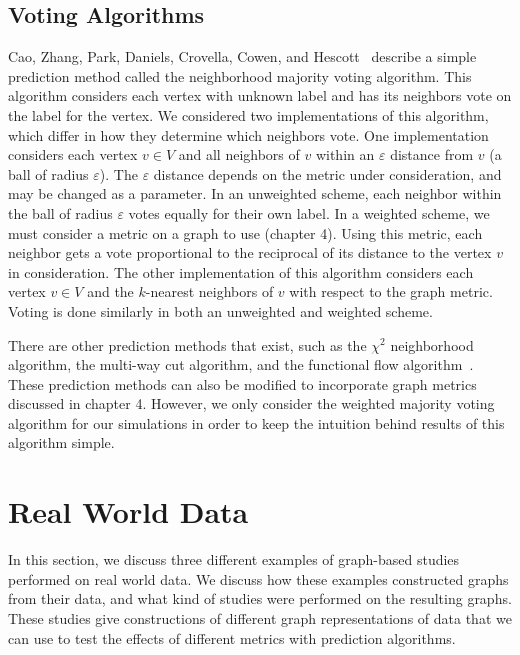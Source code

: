 \subsection{Voting Algorithms}

Cao, Zhang, Park, Daniels, Crovella, Cowen, and Hescott~\cite{10.1371/journal.pone.0076339}
describe a simple prediction method called the neighborhood majority voting
algorithm. This algorithm considers each vertex with unknown label and has
its neighbors vote on the label for the vertex. We considered two
implementations of this algorithm, which differ in how they determine which neighbors vote. One 
implementation considers each vertex $v \in V$ and all neighbors of $v$ within an $\varepsilon$
distance from $v$ (a ball of radius $\varepsilon$). The $\varepsilon$ distance depends on the metric
under consideration, and may be changed as a parameter. In an unweighted scheme, each neighbor
within the ball of radius $\varepsilon$ votes equally for their own label. In 
a weighted scheme, we must consider a metric on a graph to use (chapter 4).
Using this metric, each neighbor gets a vote proportional to the reciprocal 
of its distance to the vertex $v$ in
consideration. The other implementation of this algorithm considers each vertex $v \in V$ and
the $k$-nearest neighbors of $v$ with respect to the graph metric. Voting is done similarly in both an unweighted and weighted
scheme.

There are other prediction methods that exist, such as the $\chi^{2}$ neighborhood algorithm, the
multi-way cut algorithm, and the functional flow algorithm~\cite{10.1371/journal.pone.0076339}.
These prediction methods can also be modified to incorporate graph metrics discussed in chapter 4.
However, we only consider the weighted majority voting algorithm for our simulations in order to
keep the intuition behind results of this algorithm simple.

\section{Real World Data}

In this section, we discuss three different examples of graph-based studies performed on real world
data. We discuss how these examples constructed graphs from their data, and what kind of studies
were performed on the resulting graphs. These studies give constructions of different graph
representations of data that we can use to test the effects of different metrics with prediction
algorithms.

